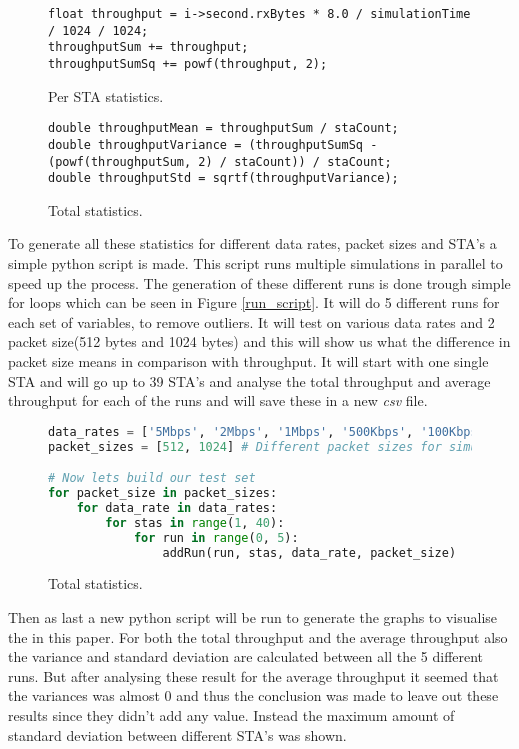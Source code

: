 \documentclass[]{article}
\begin{document}
\begin{figure}[H]
\begin{lstlisting}[frame=bt]
float throughput = i->second.rxBytes * 8.0 / simulationTime / 1024 / 1024;
throughputSum += throughput;
throughputSumSq += powf(throughput, 2);
\end{lstlisting}
\caption{Per STA statistics.\label{fig:sta_stats}}
\end{figure}

\begin{figure}[H]
\begin{lstlisting}[frame=bt]
double throughputMean = throughputSum / staCount;
double throughputVariance = (throughputSumSq - (powf(throughputSum, 2) / staCount)) / staCount;
double throughputStd = sqrtf(throughputVariance);
\end{lstlisting}
\caption{Total statistics.\label{fig:tot_stats}}
\end{figure}

To generate all these statistics for different data rates, packet sizes and STA's a simple python script is made.
This script runs multiple simulations in parallel to speed up the process.
The generation of these different runs is done trough simple for loops which can be seen in Figure \ref{run_script}.
It will do 5 different runs for each set of variables, to remove outliers.
It will test on various data rates and 2 packet size(512 bytes and 1024 bytes) and this will show us what the difference in packet size means in comparison with throughput.
It will start with one single STA and will go up to 39 STA's and analyse the total throughput and average throughput for each of the runs and will save these in a new \textit{csv} file.

\begin{figure}[H]
\begin{lstlisting}[frame=bt, language=Python]
data_rates = ['5Mbps', '2Mbps', '1Mbps', '500Kbps', '100Kbps']	# Different data rates for simulation
packet_sizes = [512, 1024] # Different packet sizes for simulation

# Now lets build our test set
for packet_size in packet_sizes:
	for data_rate in data_rates:
		for stas in range(1, 40):
			for run in range(0, 5):
				addRun(run, stas, data_rate, packet_size)
\end{lstlisting}
\caption{Total statistics.\label{fig:run_script}}
\end{figure}

Then as last a new python script will be run to generate the graphs to visualise the in this paper.
For both the total throughput and the average throughput also the variance and standard deviation are calculated between all the 5 different runs.
But after analysing these result for the average throughput it seemed that the variances was almost 0 and thus the conclusion was made to leave out these results since they didn't add any value.
Instead the maximum amount of standard deviation between different STA's was shown.
\end{document}
